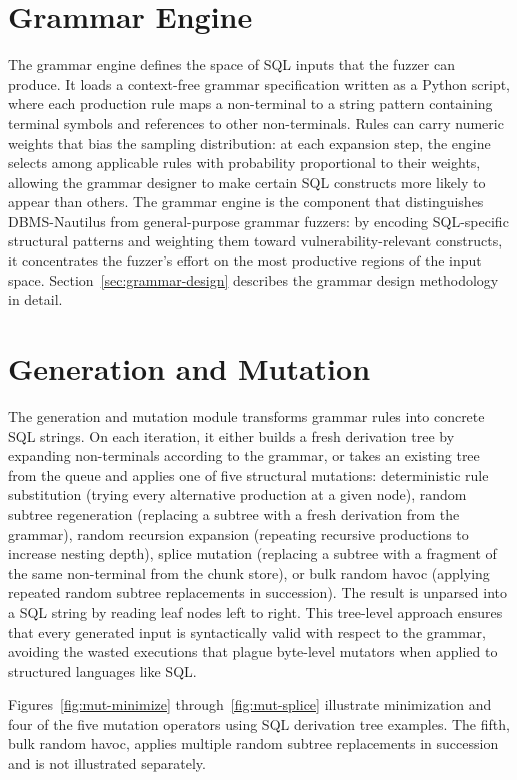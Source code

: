 \section{Grammar Engine}
The grammar engine defines the space of SQL inputs that the fuzzer can produce. It loads a context-free grammar specification written as a Python script, where each production rule maps a non-terminal to a string pattern containing terminal symbols and references to other non-terminals. Rules can carry numeric weights that bias the sampling distribution: at each expansion step, the engine selects among applicable rules with probability proportional to their weights, allowing the grammar designer to make certain SQL constructs more likely to appear than others. The grammar engine is the component that distinguishes DBMS-Nautilus from general-purpose grammar fuzzers: by encoding SQL-specific structural patterns and weighting them toward vulnerability-relevant constructs, it concentrates the fuzzer's effort on the most productive regions of the input space. Section~\ref{sec:grammar-design} describes the grammar design methodology in detail.

\section{Generation and Mutation}
The generation and mutation module transforms grammar rules into concrete SQL strings. On each iteration, it either builds a fresh derivation tree by expanding non-terminals according to the grammar, or takes an existing tree from the queue and applies one of five structural mutations: deterministic rule substitution (trying every alternative production at a given node), random subtree regeneration (replacing a subtree with a fresh derivation from the grammar), random recursion expansion (repeating recursive productions to increase nesting depth), splice mutation (replacing a subtree with a fragment of the same non-terminal from the chunk store), or bulk random havoc (applying repeated random subtree replacements in succession). The result is unparsed into a SQL string by reading leaf nodes left to right. This tree-level approach ensures that every generated input is syntactically valid with respect to the grammar, avoiding the wasted executions that plague byte-level mutators when applied to structured languages like SQL.

Figures~\ref{fig:mut-minimize} through~\ref{fig:mut-splice} illustrate minimization and four of the five mutation operators using SQL derivation tree examples. The fifth, bulk random havoc, applies multiple random subtree replacements in succession and is not illustrated separately.

